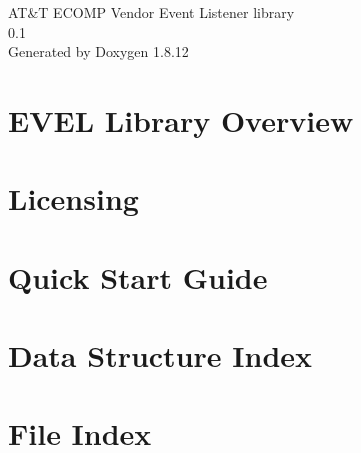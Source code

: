 \documentclass[twoside]{book}
\newcommand{\+}{\discretionary{\mbox{\scriptsize$\hookleftarrow$}}{}{}}
\newcommand{\clearemptydoublepage}{%
  \newpage{\pagestyle{empty}\cleardoublepage}%
}
\begin{document}
\hypersetup{pageanchor=false,
             bookmarksnumbered=true,
             pdfencoding=unicode
            }
\begin{titlepage}
\vspace*{7cm}
\begin{center}%
{\Large AT\&T E\+C\+O\+MP Vendor Event Listener library \\[1ex]\large 0.\+1 }\\
\vspace*{1cm}
{\large Generated by Doxygen 1.8.12}\\
\end{center}
\end{titlepage}
\clearemptydoublepage
{}
\tableofcontents
\clearemptydoublepage
{}
\hypersetup{pageanchor=true}

\chapter{E\+V\+EL Library Overview}
\label{index}\hypertarget{index}{}
\chapter{Licensing}
\label{licensing}
\hypertarget{licensing}{}

\chapter{Quick Start Guide}
\label{quickstart}
\hypertarget{quickstart}{}

\chapter{Data Structure Index}

\chapter{File Index}

\end{document}
